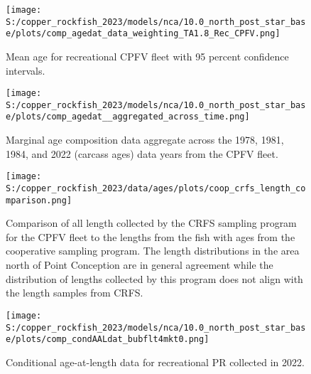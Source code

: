 \documentclass[11pt,
  letterpaper,
]{article}
\begin{document}
\pagebreak

\begin{figure}
{\centering
\texttt{[image: S:/copper\_rockfish\_2023/models/nca/10.0\_north\_post\_star\_base/plots/comp\_agedat\_data\_weighting\_TA1.8\_Rec\_CPFV.png]}
}
\caption{Mean age for recreational CPFV fleet with 95 percent confidence intervals.\label{fig:mean-rec-cpfv-age-data}}
\end{figure}

\begin{figure}
{\centering
\texttt{[image: S:/copper\_rockfish\_2023/models/nca/10.0\_north\_post\_star\_base/plots/comp\_agedat\_\_aggregated\_across\_time.png]}
}
\caption{Marginal age composition data aggregate across the 1978, 1981, 1984, and 2022 (carcass ages) data years from the CPFV fleet.\label{fig:rec-cpfv-marg-age-data}}
\end{figure}

\pagebreak

\begin{figure}
{\centering
\texttt{[image: S:/copper\_rockfish\_2023/data/ages/plots/coop\_crfs\_length\_comparison.png]}
}
\caption{Comparison of all length collected by the CRFS sampling program for the CPFV fleet to the lengths from the fish with ages from the cooperative sampling program. The length distributions in the area north of Point Conception are in general agreement while the distribution of lengths collected by this program does not align with the length samples from CRFS.\label{fig:coop-len-comparison}}
\end{figure}

\pagebreak

\begin{figure}
{\centering
\texttt{[image: S:/copper\_rockfish\_2023/models/nca/10.0\_north\_post\_star\_base/plots/comp\_condAALdat\_bubflt4mkt0.png]}
}
\caption{Conditional age-at-length data for recreational PR collected in 2022.\label{fig:rec-pr-caal-data}}
\end{figure}
\end{document}

